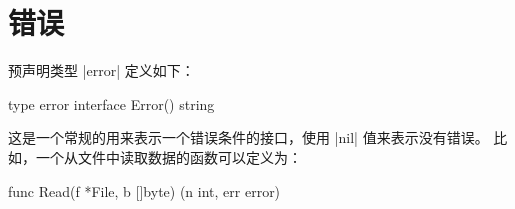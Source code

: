 \chapter{错误}
预声明类型 \code|error| 定义如下：
\begin{golang}
type error interface {
	Error() string
}
\end{golang}
这是一个常规的用来表示一个错误条件的接口，使用 \code|nil| 值来表示没有错误。
比如，一个从文件中读取数据的函数可以定义为：
\begin{golang}
func Read(f *File, b []byte) (n int, err error)
\end{golang}